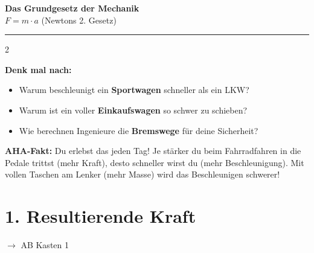 \documentclass[11pt, a4paper]{article}
\begin{document}

\begin{center}
    {\LARGE\bfseries\textcolor{fachfarbe}{Das Grundgesetz der Mechanik}}\\[0.3em]
    {\large $F = m \cdot a$ \quad (Newtons 2. Gesetz)}
\end{center}
\vspace{-0.2em}
\hrule
\vspace{0.8em}

\begin{multicols}{2}


\begin{tcolorbox}[
    colback=fachfarbe!10,
    colframe=fachfarbe,
    boxrule=1.5pt,
    arc=0pt,
    left=8pt, right=8pt, top=6pt, bottom=6pt,
    title={\textcolor{white}{\textbf{Warum ist das wichtig für DICH?}}}
]
\small
\textbf{Denk mal nach:}
\begin{itemize}[leftmargin=1.2em, itemsep=2pt]
    \item Warum beschleunigt ein \textbf{Sportwagen} schneller als ein LKW?
    \item Warum ist ein voller \textbf{Einkaufswagen} so schwer zu schieben?
    \item Wie berechnen Ingenieure die \textbf{Bremswege} für deine Sicherheit?
\end{itemize}

\vspace{0.3em}
\textbf{AHA-Fakt:} Du erlebst das jeden Tag! Je stärker du beim Fahrradfahren in die Pedale trittst (mehr Kraft), desto schneller wirst du (mehr Beschleunigung). Mit vollen Taschen am Lenker (mehr Masse) wird das Beschleunigen schwerer!
\end{tcolorbox}

\vspace{0.4em}


\section*{\textcolor{fachfarbe}{1. Resultierende Kraft}}
{\small\textcolor{mittelgrau}{$\rightarrow$ AB Kasten 1}}


\end{multicols}
\end{document}
